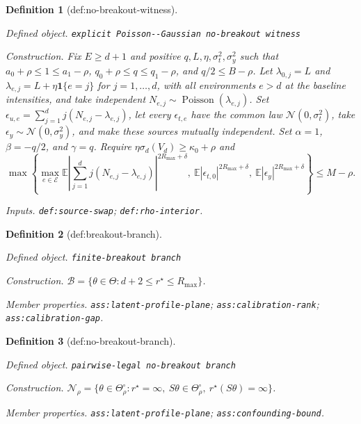 \documentclass{article}
\newtheorem{definition}{Definition}
\begin{document}
\begin{definition}[def:no-breakout-witness]\label{def:no-breakout-witness}
\par\smallskip\noindent\emph{Defined object.} \texttt{explicit Poisson-\allowbreak{}-\allowbreak{}Gaussian no-\allowbreak{}breakout witness}
\par\smallskip\noindent\emph{Construction.} Fix \(E\ge d+1\) and positive \(q,L,\eta,\sigma_t^2,\sigma_y^2\) such that \(a_0+\rho\le1\le a_1-\rho\), \(q_0+\rho\le q\le q_1-\rho\), and \(q/2\le B-\rho\).  Let \(\lambda_{0,j}=L\) and \(\lambda_{e,j}=L+\eta\mathbf 1\{e=j\}\) for \(j=1,\ldots,d\), with all environments \(e>d\) at the baseline intensities, and take independent \(N_{e,j}\sim\operatorname{Poisson}(\lambda_{e,j})\).  Set \(\epsilon_{u,e}=\sum_{j=1}^d j(N_{e,j}-\lambda_{e,j})\), let every \(\epsilon_{t,e}\) have the common law \(\mathcal N(0,\sigma_t^2)\), take \(\epsilon_y\sim\mathcal N(0,\sigma_y^2)\), and make these sources mutually independent.  Set \(\alpha=1\), \(\beta=-q/2\), and \(\gamma=q\).  Require \(\eta\sigma_d(V_d)\ge\kappa_0+\rho\) and \[\max\left\{\max_{e\in\mathcal E}\mathbb E\left|\sum_{j=1}^d j(N_{e,j}-\lambda_{e,j})\right|^{2R_{\max}+\delta},\ \mathbb E|\epsilon_{t,0}|^{2R_{\max}+\delta},\ \mathbb E|\epsilon_y|^{2R_{\max}+\delta}\right\}\le M-\rho.\]
\par\smallskip\noindent\emph{Inputs.} \texttt{def:\allowbreak{}source-\allowbreak{}swap}; \texttt{def:\allowbreak{}rho-\allowbreak{}interior}.
\end{definition}

\begin{definition}[def:breakout-branch]\label{def:breakout-branch}
\par\smallskip\noindent\emph{Defined object.} \texttt{finite-\allowbreak{}breakout branch}
\par\smallskip\noindent\emph{Construction.} \(\mathcal B=\{\theta\in\Theta:d+2\le r^\star\le R_{\max}\}\).
\par\smallskip\noindent\emph{Member properties.} \texttt{ass:\allowbreak{}latent-\allowbreak{}profile-\allowbreak{}plane}; \texttt{ass:\allowbreak{}calibration-\allowbreak{}rank}; \texttt{ass:\allowbreak{}calibration-\allowbreak{}gap}.
\end{definition}

\begin{definition}[def:no-breakout-branch]\label{def:no-breakout-branch}
\par\smallskip\noindent\emph{Defined object.} \texttt{pairwise-\allowbreak{}legal no-\allowbreak{}breakout branch}
\par\smallskip\noindent\emph{Construction.} \(\mathcal N_\rho=\{\theta\in\Theta_\rho^\circ:r^\star=\infty,\ S\theta\in\Theta_\rho^\circ,\ r^\star(S\theta)=\infty\}\).
\par\smallskip\noindent\emph{Member properties.} \texttt{ass:\allowbreak{}latent-\allowbreak{}profile-\allowbreak{}plane}; \texttt{ass:\allowbreak{}confounding-\allowbreak{}bound}.
\end{definition}
\end{document}
